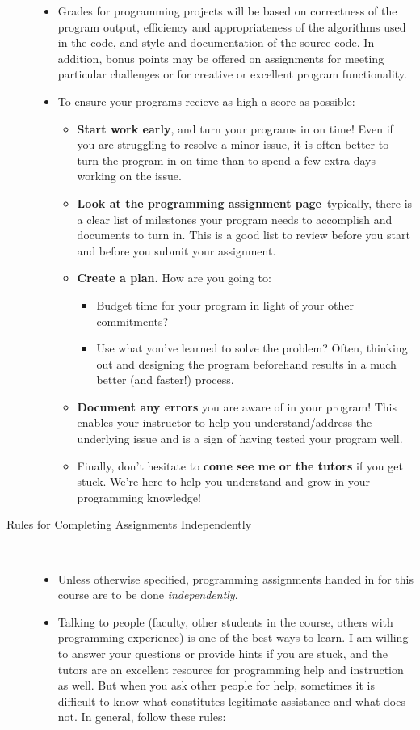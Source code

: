 \documentclass [letterpaper,11pt]{article}
\begin{document}
\begin{description}
\begin{itemize}
\item Grades for programming projects will be based on correctness of the program output, efficiency and appropriateness of the algorithms used in the code, and style and documentation of the source code.  In addition, bonus points may be offered on assignments for meeting particular challenges or for creative or excellent program functionality.

\item To ensure your programs recieve as high a score as possible:
	\begin{itemize}
	\item  \textbf{Start work early}, and turn your programs in on time!  Even if you are struggling to resolve a minor issue, it is often better to turn the program in on time than to spend a few extra days working on the issue.
	\item 	\textbf{Look at the programming assignment page}--typically, there is a clear list of milestones your program needs to accomplish and documents to turn in.  This is a good list to review before you start and before you submit your assignment.
	\item  \textbf{Create a plan.} How are you going to:
\begin{itemize}
\item Budget time for your program in light of your other commitments?
\item Use what you've learned to solve the problem?  Often, thinking out and designing the program beforehand results in a much better (and faster!) process.
\end{itemize}
	\item	\textbf{Document any errors} you are aware of in your program!  This enables your instructor to help you understand/address the underlying issue and is a sign of having tested your program well.
\item 	Finally, don't hesitate to \textbf{come see me or the tutors} if you get stuck.  We're here to help you understand and grow in your programming knowledge!
\end{itemize}
\end{itemize}

\item[Rules for Completing Assignments Independently]\
\begin{itemize}
        \item Unless otherwise specified, programming assignments handed in for this course are to be done \emph{independently}.  
        \item Talking to people (faculty, other students in the course, others with programming experience) is one of the best ways to learn.  I am willing to answer your questions or provide hints if you are stuck, and the tutors are an excellent resource for programming help and instruction as well.  But when you ask other people for help, sometimes
        it is difficult to know what constitutes legitimate assistance and what does not.  In general, follow these rules:
        

\end{itemize}
\end{description}
\end{document}
